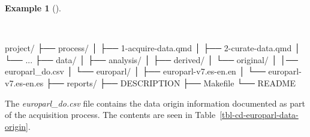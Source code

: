 \documentclass[
  letterpaper,
]{latex/krantz}
\newenvironment{Shaded}{\begin{snugshade}}{\end{snugshade}}
\newcommand{\ExtensionTok}[1]{\textcolor[rgb]{0.00,0.00,0.00}{#1}}
\newcommand{\NormalTok}[1]{\textcolor[rgb]{0.00,0.00,0.00}{#1}}
\theoremstyle{definition}
\newtheorem{example}{Example}[chapter]
\theoremstyle{remark}
\begin{document}
\begin{example}[]\protect\hypertarget{exm-cd-europarl-file-structure}{}\label{exm-cd-europarl-file-structure}

~

\begin{Shaded}
\begin{Highlighting}[]
\ExtensionTok{project/}
\ExtensionTok{├──}\NormalTok{ process/}
\ExtensionTok{│}\NormalTok{   ├── 1{-}acquire{-}data.qmd}
\ExtensionTok{│}\NormalTok{   ├── 2{-}curate{-}data.qmd}
\ExtensionTok{│}\NormalTok{   └── ...}
\ExtensionTok{├──}\NormalTok{ data/}
\ExtensionTok{│}\NormalTok{   ├── analysis/}
\ExtensionTok{│}\NormalTok{   ├── derived/}
\ExtensionTok{│}\NormalTok{   └── original/}
\ExtensionTok{│}\NormalTok{       │── europarl\_do.csv}
\ExtensionTok{│}\NormalTok{       └── europarl/}
\ExtensionTok{│}\NormalTok{           ├── europarl{-}v7.es{-}en.en}
\ExtensionTok{│}\NormalTok{           └── europarl{-}v7.es{-}en.es}
\ExtensionTok{├──}\NormalTok{ reports/}
\ExtensionTok{├──}\NormalTok{ DESCRIPTION}
\ExtensionTok{├──}\NormalTok{ Makefile}
\ExtensionTok{└──}\NormalTok{ README}
\end{Highlighting}
\end{Shaded}

\end{example}

The \emph{europarl\_do.csv} file contains the data origin information
documented as part of the acquisition process. The contents are seen in
Table~\ref{tbl-cd-europarl-data-origin}.
\end{document}
